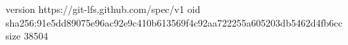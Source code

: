 version https://git-lfs.github.com/spec/v1
oid sha256:91e5dd89075e96ac92e9c410b613569f4c92aa722255a605203db5462d4fb6cc
size 38504
